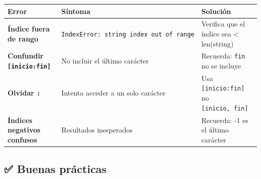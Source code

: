\documentclass[
  doc,
  floatsintext,
  longtable,
  a4paper,
  nolmodern,
  notxfonts,
  notimes,
  12pt,
  colorlinks=true,linkcolor=blue,citecolor=blue,urlcolor=blue]{apa7}
\newcounter{none} %
\begin{document}
{\def\LTcaptype{none} %
\begin{longtable}[]{@{}
  >{\raggedright\arraybackslash}p{}
  >{\raggedright\arraybackslash}p{}
  >{\raggedright\arraybackslash}p{}@{}}
\toprule\noalign{}
\begin{minipage}[b]{\linewidth}\raggedright
Error
\end{minipage} & \begin{minipage}[b]{\linewidth}\raggedright
Síntoma
\end{minipage} & \begin{minipage}[b]{\linewidth}\raggedright
Solución
\end{minipage} \\
\midrule\noalign{}
\endhead
\bottomrule\noalign{}
\endlastfoot
\textbf{Índice fuera de rango} &
\texttt{IndexError:\ string\ index\ out\ of\ range} & Verifica que el
índice sea \textless{} len(string) \\
\textbf{Confundir \texttt{{[}inicio:fin{]}}} & No incluir el último
carácter & Recuerda: \texttt{fin} no se incluye \\
\textbf{Olvidar \texttt{:}} & Intenta acceder a un solo carácter & Usa
\texttt{{[}inicio:fin{]}} no \texttt{{[}inicio,\ fin{]}} \\
\textbf{Índices negativos confusos} & Resultados inesperados & Recuerda:
-1 es el último carácter \\
\end{longtable}
}

\subsection{✅ Buenas prácticas}\label{buenas-pruxe1cticas}
\end{document}
